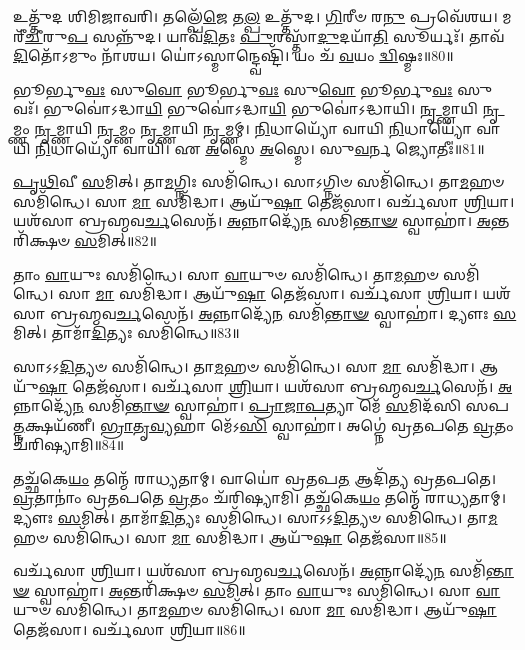 𑌉𑌤𑍍𑌤𑍁᳴𑌦 𑌶𑌿𑌮𑌿𑌜𑌾𑌵𑌰𑌿। 
𑌤𑌲𑍍𑌪𑍇᳴\-\ul{𑌜𑍇} 𑌤\-\ul{𑌲𑍍𑌪} 𑌉𑌤𑍍𑌤𑍁᳴𑌦। 
\-\ul{𑌗𑌿}\-𑌰𑍀𑍞 𑌰\-\ul{𑌨𑍁} 𑌪𑍍𑌰𑌵𑍇᳴𑌶𑌯। 
𑌮𑌰𑍀᳴\-\ul{𑌚𑍀}\-𑌰𑍁\-\ul{𑌪} 𑌸𑌨𑍍𑌨𑍁᳴𑌦। 
𑌯𑌾𑌵᳴\-\ul{𑌦𑌿}\-𑌤𑌃 \ul{𑌪𑍁}\-𑌰𑌸𑍍𑌤𑌾᳴\-\ul{𑌦𑍁}\-𑌦𑌯𑌾᳴\-\ul{𑌤𑌿} 𑌸𑍂𑌰𑍍𑌯𑌃᳴। 
𑌤𑌾𑌵᳴\-\ul{𑌦𑌿}\-𑌤𑍋᳴𑌽𑌮𑍁𑌂 𑌨𑌾᳴𑌶𑌯। 
𑌯𑍋॑𑌽𑌸𑍍𑌮𑌾𑌨𑍍𑌦𑍍𑌵𑍇𑌷𑍍𑌟𑌿᳴। 
𑌯𑌂 𑌚᳴ \ul{𑌵}\-𑌯𑌂 \ul{𑌦𑍍𑌵𑌿}\-𑌷𑍍𑌮𑌃॥80॥%
\anuvakamend


𑌭𑍂𑌰𑍍𑌭𑍁\-\ul{𑌵𑌃} 𑌸𑍁\-\ul{𑌵𑍋} 𑌭𑍂𑌰𑍍𑌭𑍁\-\ul{𑌵𑌃} 𑌸𑍁\-\ul{𑌵𑍋} 𑌭𑍂𑌰𑍍𑌭𑍁\-\ul{𑌵𑌃} 𑌸𑍁𑌵𑌃᳴। 
𑌭𑍁𑌵𑍋॑𑌽𑌦𑍍𑌧𑌾\-\ul{𑌯𑌿} 𑌭𑍁𑌵𑍋॑𑌽𑌦𑍍𑌧𑌾\-\ul{𑌯𑌿} 𑌭𑍁𑌵𑍋॑𑌽𑌦𑍍𑌧𑌾𑌯𑌿। 
\-\ul{𑌨𑍃}\-𑌮𑍍𑌣𑌾𑌯𑌿 \ul{𑌨𑍃}\-𑌮𑍍𑌣𑌂 \ul{𑌨𑍃}\-𑌮𑍍𑌣𑌾𑌯𑌿 \ul{𑌨𑍃}\-𑌮𑍍𑌣𑌂 \ul{𑌨𑍃}\-𑌮𑍍𑌣𑌾𑌯𑌿 \ul{𑌨𑍃}\-𑌮𑍍𑌣𑌮𑍍। 
\-\ul{𑌨𑌿}\-𑌧𑌾𑌯𑍍𑌯𑍋᳴ 𑌵𑌾𑌯𑌿 \ul{𑌨𑌿}\-𑌧𑌾𑌯𑍍𑌯𑍋᳴ 𑌵𑌾𑌯𑌿 \ul{𑌨𑌿}\-𑌧𑌾𑌯𑍍𑌯𑍋᳴ 𑌵𑌾𑌯𑌿। 
𑌏 \ul{𑌅}\-𑌸𑍍𑌮𑍇 \ul{𑌅}\-𑌸𑍍𑌮𑍇। 
𑌸𑍁\-\ul{𑌵}\-𑌰𑍍𑌨 𑌜𑍍𑌯𑍋𑌤𑍀𑌃॑॥81॥
\anuvakamend


\-\ul{𑌪𑍃}\-\-\ul{𑌥𑌿}\-𑌵𑍀 \ul{𑌸}\-𑌮𑌿𑌤𑍍। 
𑌤𑌾\-\ul{𑌮}\-𑌗𑍍𑌨𑌿𑌃 𑌸𑌮𑌿᳴𑌨𑍍𑌧𑍇। 
𑌸𑌾𑌽𑌗𑍍𑌨𑌿𑍞 𑌸𑌮𑌿᳴𑌨𑍍𑌧𑍇। 
𑌤𑌾\-\ul{𑌮}\-𑌹𑍞 𑌸𑌮𑌿᳴𑌨𑍍𑌧𑍇। 
𑌸𑌾 \ul{𑌮𑌾} 𑌸𑌮𑌿᳴𑌦𑍍𑌧𑌾। 
𑌆𑌯𑍁᳴\-\ul{𑌷𑌾} 𑌤𑍇𑌜᳴𑌸𑌾। 
𑌵𑌰𑍍𑌚᳴𑌸𑌾 \ul{𑌶𑍍𑌰𑌿}\-𑌯𑌾। 
𑌯𑌶᳴𑌸𑌾 𑌬𑍍𑌰𑌹𑍍𑌮𑌵\-\ul{𑌰𑍍𑌚}\-𑌸𑍇𑌨᳴। 
\-\ul{𑌅}\-𑌨𑍍𑌨𑌾𑌦𑍍𑌯𑍇᳴\-\ul{𑌨} 𑌸𑌮𑌿᳴\-\ul{𑌨𑍍𑌤𑌾}\-\-\ul{𑍟} 𑌸𑍍𑌵𑌾𑌹𑌾॑। 
\-\ul{𑌅}\-𑌨𑍍𑌤𑌰𑌿᳴𑌕𑍍𑌷𑍞 \ul{𑌸}\-𑌮𑌿𑌤𑍍॥82॥

𑌤𑌾𑌂 \ul{𑌵𑌾}\-𑌯𑍁𑌃 𑌸𑌮𑌿᳴𑌨𑍍𑌧𑍇। 
𑌸𑌾 \ul{𑌵𑌾}\-𑌯𑍁𑍞 𑌸𑌮𑌿᳴𑌨𑍍𑌧𑍇। 
𑌤𑌾\-\ul{𑌮}\-𑌹𑍞 𑌸𑌮𑌿᳴𑌨𑍍𑌧𑍇। 
𑌸𑌾 \ul{𑌮𑌾} 𑌸𑌮𑌿᳴𑌦𑍍𑌧𑌾। 
𑌆𑌯𑍁᳴\-\ul{𑌷𑌾} 𑌤𑍇𑌜᳴𑌸𑌾। 
𑌵𑌰𑍍𑌚᳴𑌸𑌾 \ul{𑌶𑍍𑌰𑌿}\-𑌯𑌾। 
𑌯𑌶᳴𑌸𑌾 𑌬𑍍𑌰𑌹𑍍𑌮𑌵\-\ul{𑌰𑍍𑌚}\-𑌸𑍇𑌨᳴। 
\-\ul{𑌅}\-𑌨𑍍𑌨𑌾𑌦𑍍𑌯𑍇᳴\-\ul{𑌨} 𑌸𑌮𑌿᳴\-\ul{𑌨𑍍𑌤𑌾}\-\-\ul{𑍟} 𑌸𑍍𑌵𑌾𑌹𑌾॑। 
𑌦𑍍𑌯𑍗𑌃 \ul{𑌸}\-𑌮𑌿𑌤𑍍। 
𑌤𑌾𑌮𑌾᳴\-\ul{𑌦𑌿}\-𑌤𑍍𑌯𑌃 𑌸𑌮𑌿᳴𑌨𑍍𑌧𑍇॥83॥

𑌸𑌾𑌽𑌽\-\ul{𑌦𑌿}\-𑌤𑍍𑌯𑍞 𑌸𑌮𑌿᳴𑌨𑍍𑌧𑍇। 
𑌤𑌾\-\ul{𑌮}\-𑌹𑍞 𑌸𑌮𑌿᳴𑌨𑍍𑌧𑍇। 
𑌸𑌾 \ul{𑌮𑌾} 𑌸𑌮𑌿᳴𑌦𑍍𑌧𑌾। 
𑌆𑌯𑍁᳴\-\ul{𑌷𑌾} 𑌤𑍇𑌜᳴𑌸𑌾। 
𑌵𑌰𑍍𑌚᳴𑌸𑌾 \ul{𑌶𑍍𑌰𑌿}\-𑌯𑌾। 
𑌯𑌶᳴𑌸𑌾 𑌬𑍍𑌰𑌹𑍍𑌮𑌵\-\ul{𑌰𑍍𑌚}\-𑌸𑍇𑌨᳴। 
\-\ul{𑌅}\-𑌨𑍍𑌨𑌾𑌦𑍍𑌯𑍇᳴\-\ul{𑌨} 𑌸𑌮𑌿᳴\-\ul{𑌨𑍍𑌤𑌾}\-\-\ul{𑍟} 𑌸𑍍𑌵𑌾𑌹𑌾॑। 
\-\ul{𑌪𑍍𑌰𑌾}\-\-\ul{𑌜𑌾}\-\-\ul{𑌪}\-𑌤𑍍𑌯𑌾 𑌮𑍇᳴ \ul{𑌸}\-𑌮𑌿𑌦᳴𑌸𑌿 𑌸𑌪\-\ul{𑌤𑍍𑌨}\-𑌕𑍍𑌷𑌯᳴𑌣𑍀। 
\-\ul{𑌭𑍍𑌰𑌾}\-\-\ul{𑌤𑍃}\-\-\ul{𑌵𑍍𑌯}\-𑌹𑌾 𑌮𑍇᳴𑌽\-\ul{𑌸𑌿} 𑌸𑍍𑌵𑌾𑌹𑌾॑। 
𑌅𑌗𑍍𑌨𑍇॑ 𑌵𑍍𑌰𑌤𑌪𑌤𑍇 \ul{𑌵𑍍𑌰}\-𑌤𑌂 𑌚᳴𑌰𑌿𑌷𑍍𑌯𑌾𑌮𑌿॥84॥

𑌤𑌚𑍍𑌛᳴𑌕𑍇\-\ul{𑌯𑌂} 𑌤𑌨𑍍𑌮𑍇᳴ 𑌰𑌾𑌧𑍍𑌯𑌤𑌾𑌮𑍍। 
𑌵𑌾𑌯𑍋॑ 𑌵𑍍𑌰𑌤𑌪\-\ul{𑌤} 𑌆𑌦𑌿᳴𑌤𑍍𑌯 𑌵𑍍𑌰𑌤𑌪𑌤𑍇। 
\-\ul{𑌵𑍍𑌰}\-𑌤𑌾𑌨𑌾𑌂॑ 𑌵𑍍𑌰𑌤𑌪𑌤𑍇 \ul{𑌵𑍍𑌰}\-𑌤𑌂 𑌚᳴𑌰𑌿𑌷𑍍𑌯𑌾𑌮𑌿। 
𑌤𑌚𑍍𑌛᳴𑌕𑍇\-\ul{𑌯𑌂} 𑌤𑌨𑍍𑌮𑍇᳴ 𑌰𑌾𑌧𑍍𑌯𑌤𑌾𑌮𑍍। 
𑌦𑍍𑌯𑍗𑌃 \ul{𑌸}\-𑌮𑌿𑌤𑍍। 
𑌤𑌾𑌮𑌾᳴\-\ul{𑌦𑌿}\-𑌤𑍍𑌯𑌃 𑌸𑌮𑌿᳴𑌨𑍍𑌧𑍇। 
𑌸𑌾𑌽𑌽\-\ul{𑌦𑌿}\-𑌤𑍍𑌯𑍞 𑌸𑌮𑌿᳴𑌨𑍍𑌧𑍇। 
𑌤𑌾\-\ul{𑌮}\-𑌹𑍞 𑌸𑌮𑌿᳴𑌨𑍍𑌧𑍇। 
𑌸𑌾 \ul{𑌮𑌾} 𑌸𑌮𑌿᳴𑌦𑍍𑌧𑌾। 
𑌆𑌯𑍁᳴\-\ul{𑌷𑌾} 𑌤𑍇𑌜᳴𑌸𑌾॥85॥

𑌵𑌰𑍍𑌚᳴𑌸𑌾 \ul{𑌶𑍍𑌰𑌿}\-𑌯𑌾। 
𑌯𑌶᳴𑌸𑌾 𑌬𑍍𑌰𑌹𑍍𑌮𑌵\-\ul{𑌰𑍍𑌚}\-𑌸𑍇𑌨᳴। 
\-\ul{𑌅}\-𑌨𑍍𑌨𑌾𑌦𑍍𑌯𑍇᳴\-\ul{𑌨} 𑌸𑌮𑌿᳴\-\ul{𑌨𑍍𑌤𑌾}\-\-\ul{𑍟} 𑌸𑍍𑌵𑌾𑌹𑌾॑। 
\-\ul{𑌅}\-𑌨𑍍𑌤𑌰𑌿᳴𑌕𑍍𑌷𑍞 \ul{𑌸}\-𑌮𑌿𑌤𑍍। 
𑌤𑌾𑌂 \ul{𑌵𑌾}\-𑌯𑍁𑌃 𑌸𑌮𑌿᳴𑌨𑍍𑌧𑍇। 
𑌸𑌾 \ul{𑌵𑌾}\-𑌯𑍁𑍞 𑌸𑌮𑌿᳴𑌨𑍍𑌧𑍇। 
𑌤𑌾\-\ul{𑌮}\-𑌹𑍞 𑌸𑌮𑌿᳴𑌨𑍍𑌧𑍇। 
𑌸𑌾 \ul{𑌮𑌾} 𑌸𑌮𑌿᳴𑌦𑍍𑌧𑌾। 
𑌆𑌯𑍁᳴\-\ul{𑌷𑌾} 𑌤𑍇𑌜᳴𑌸𑌾। 
𑌵𑌰𑍍𑌚᳴𑌸𑌾 \ul{𑌶𑍍𑌰𑌿}\-𑌯𑌾॥86॥

